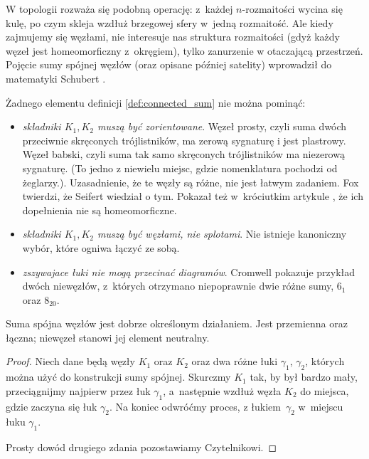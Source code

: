 W topologii rozważa się podobną operację: z~każdej $n$-rozmaitości wycina się kulę, po czym skleja wzdłuż brzegowej sfery w~jedną rozmaitość.
Ale kiedy zajmujemy się węzłami, nie interesuje nas struktura rozmaitości (gdyż każdy węzeł jest homeomorficzny z~okręgiem), tylko zanurzenie w otaczającą przestrzeń.
Pojęcie sumy spójnej węzłów (oraz opisane później satelity) wprowadził do matematyki Schubert \cite{schubert1949}.
%

Żadnego elementu definicji \ref{def:connected_sum} nie można pominąć:
\begin{itemize}
    \item \emph{składniki $K_1, K_2$ muszą być zorientowane}. 
    Węzeł prosty, czyli suma dwóch przeciwnie skręconych trójlistników, ma zerową sygnaturę i jest plastrowy.
    Węzeł babski, czyli suma tak samo skręconych trójlistników ma niezerową sygnaturę.
    (To jedno z niewielu miejsc, gdzie nomenklatura pochodzi od żeglarzy.).
    \label{two_sums_of_two_trefoils}%
    Uzasadnienie, że te węzły są różne, nie jest łatwym zadaniem.
    Fox twierdzi, że Seifert \cite{seifert1933} wiedział o tym.
    Pokazał też w~króciutkim artykule \cite{fox1952}, że ich dopełnienia nie są homeomorficzne.
    \item \emph{składniki $K_1, K_2$ muszą być węzłami, nie splotami}. Nie istnieje kanoniczny wybór, które ogniwa łączyć ze sobą.
    \item \emph{zszywajace łuki nie mogą przecinać diagramów}.
    Cromwell \cite[s. 90]{cromwell2004} pokazuje przykład dwóch niewęzłów, z~których otrzymano niepoprawnie dwie różne sumy, $6_1$ oraz $8_{20}$.
\end{itemize}

\begin{proposition}
    Suma spójna węzłów jest dobrze określonym działaniem.
    Jest przemienna oraz łączna; niewęzeł stanowi jej element neutralny.
\end{proposition}

\begin{proof}
    Niech dane będą węzły $K_1$ oraz $K_2$ oraz dwa różne łuki $\gamma_1$, $\gamma_2$, których można użyć do konstrukcji sumy spójnej.
    Skurczmy $K_1$ tak, by był bardzo mały, przeciągnijmy najpierw przez łuk $\gamma_1$, a~następnie wzdłuż węzła $K_2$ do miejsca, gdzie zaczyna się łuk $\gamma_2$.
    Na koniec odwróćmy proces, z łukiem~$\gamma_2$ w~miejscu łuku $\gamma_1$.

    Prosty dowód drugiego zdania pozostawiamy Czytelnikowi.
\end{proof}


